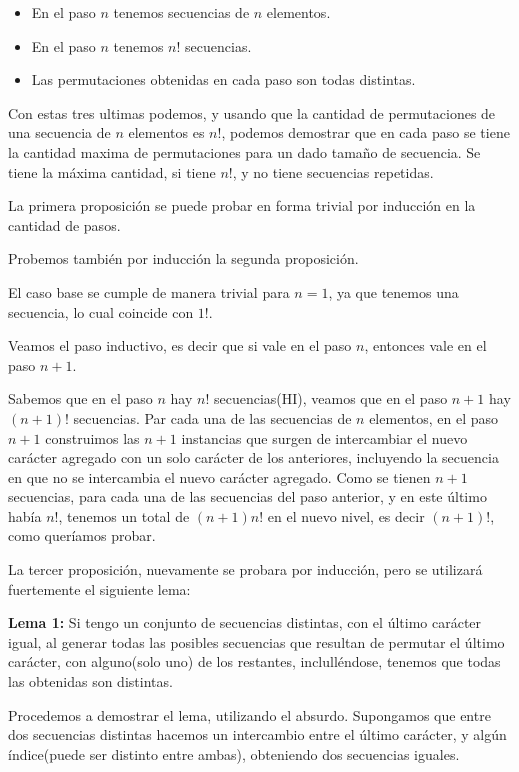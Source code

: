 \begin{itemize}
\item En el paso $ n $ tenemos secuencias de $ n $ elementos.
\item En el paso $ n $ tenemos $ n! $ secuencias.
\item Las permutaciones obtenidas en cada paso son todas distintas.
\end{itemize}

Con estas tres ultimas podemos, y usando que la cantidad de permutaciones de una secuencia de $ n $ elementos es $ n! $, podemos demostrar que en cada paso se tiene la cantidad maxima de permutaciones para un dado tamaño de secuencia. Se tiene la máxima cantidad, si tiene $ n! $, y no tiene secuencias repetidas.

La primera proposición se puede probar en forma trivial por inducción en la cantidad de pasos.

Probemos también por inducción la segunda proposición. 

El caso base se cumple de manera trivial para $ n=1 $, ya que tenemos una secuencia, lo cual coincide con $1! $. 

Veamos el paso inductivo, es decir que si vale en el paso $ n $, entonces vale en el paso $ n+1 $. 

Sabemos que en el paso $ n $ hay $ n! $ secuencias(HI), veamos que en el paso $ n+1 $ hay $ (n+1)! $ secuencias. Par cada una de las secuencias de $ n $ elementos, en el paso $ n+1 $ construimos las $ n+1 $ instancias que surgen de intercambiar el nuevo carácter agregado con un solo carácter de los anteriores, incluyendo la secuencia en que no se intercambia el nuevo carácter agregado. Como se tienen $ n+1 $ secuencias, para cada una de las secuencias del paso anterior, y en este último había $ n! $, tenemos un total de $ (n+1)n! $ en el nuevo nivel, es decir $ (n+1)! $, como queríamos probar.

La tercer proposición, nuevamente se probara por inducción, pero se utilizará fuertemente el siguiente lema:
\bigskip

\textbf{Lema 1:} Si tengo un conjunto de secuencias distintas, con el último carácter igual, al generar todas las posibles secuencias que resultan de permutar el último carácter, con alguno(solo uno) de los restantes, inclulléndose, tenemos que todas las obtenidas son distintas.
\bigskip

Procedemos a demostrar el lema, utilizando el absurdo. Supongamos que entre dos secuencias distintas hacemos un intercambio entre el último carácter, y algún índice(puede ser distinto entre ambas), obteniendo dos secuencias iguales.

